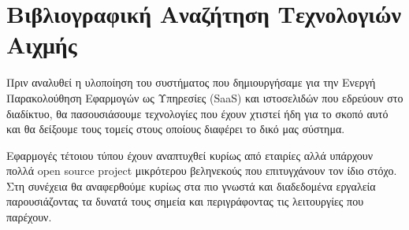\chapter{Βιβλιογραφική Αναζήτηση Τεχνολογιών Αιχμής}
\label{chapter:state_of_the_art}

Πριν αναλυθεί η υλοποίηση του συστήματος που δημιουργήσαμε για την Ενεργή Παρακολούθηση
Eφαρμογών ως Υπηρεσίες (SaaS) και ιστοσελιδών που εδρεύουν στο διαδίκτυο, θα πασουσιάσουμε τεχνολογίες
που έχουν χτιστεί ήδη για το σκοπό αυτό και θα δείξουμε τους τομείς στους οποίους
διαφέρει το δικό μας σύστημα.

Εφαρμογές τέτοιου τύπου έχουν αναπτυχθεί κυρίως από εταιρίες αλλά υπάρχουν πολλά open source
project μικρότερου βεληνεκούς που επιτυγχάνουν τον ίδιο στόχο. Στη συνέχεια θα αναφερθούμε κυρίως στα
πιο γνωστά και διαδεδομένα εργαλεία παρουσιάζοντας τα δυνατά τους σημεία και περιγράφοντας τις λειτουργίες
που παρέχουν.


